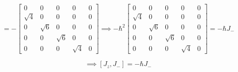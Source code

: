 \documentclass[letter, 10pts]{article}
\newcommand{\hb}{\hbar}
\begin{document}
\[
=
-
\begin{bmatrix}
0 & 0 & 0 & 0 & 0 \\
\sqrt{4} & 0 & 0 & 0 & 0 \\
0 & \sqrt{6} & 0 & 0 & 0 \\
0 & 0 & \sqrt{6} & 0 & 0 \\
0 & 0 & 0 & \sqrt{4} & 0
\end{bmatrix}
\implies -\hb^2 
\begin{bmatrix}
0 & 0 & 0 & 0 & 0 \\
\sqrt{4} & 0 & 0 & 0 & 0 \\
0 & \sqrt{6} & 0 & 0 & 0 \\
0 & 0 & \sqrt{6} & 0 & 0 \\
0 & 0 & 0 & \sqrt{4} & 0
\end{bmatrix} = - \hb J_-
\] 

\[\implies
	[J_z , J_-] = - \hb J_-
\] 
\end{document}
